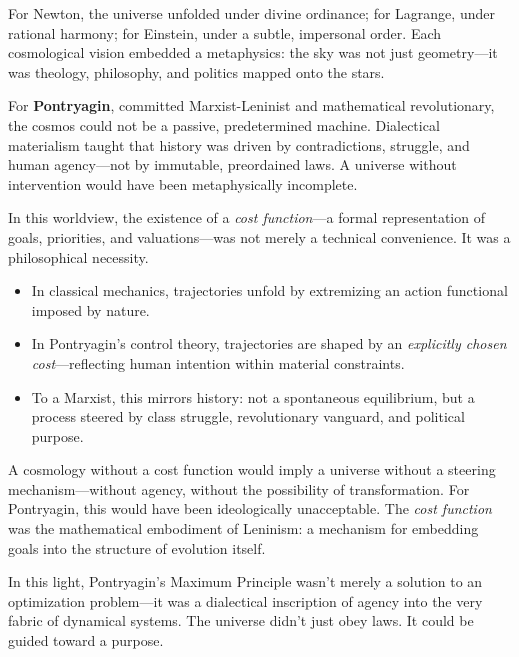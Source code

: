 \begin{tcolorbox}[colback=gray!10, colframe=black, title={Sidebar: Why a Marxist Cosmology Needed a Cost Function}, fonttitle=\bfseries, breakable]

  For Newton, the universe unfolded under divine ordinance; for Lagrange, under rational harmony; for Einstein, under a subtle, impersonal order. Each cosmological vision embedded a metaphysics: the sky was not just geometry—it was theology, philosophy, and politics mapped onto the stars.

  \medskip
  
  For \textbf{Pontryagin}, committed Marxist-Leninist and mathematical revolutionary, the cosmos could not be a passive, predetermined machine. Dialectical materialism taught that history was driven by contradictions, struggle, and human agency—not by immutable, preordained laws. A universe without intervention would have been metaphysically incomplete.

  \medskip
  
  In this worldview, the existence of a \emph{cost function}—a formal representation of goals, priorities, and valuations—was not merely a technical convenience. It was a philosophical necessity.

  \medskip
  
  \begin{itemize}
    \item In classical mechanics, trajectories unfold by extremizing an action functional imposed by nature.
    \item In Pontryagin’s control theory, trajectories are shaped by an \emph{explicitly chosen cost}—reflecting human intention within material constraints.
    \item To a Marxist, this mirrors history: not a spontaneous equilibrium, but a process steered by class struggle, revolutionary vanguard, and political purpose.
  \end{itemize}

  \medskip
  
  A cosmology without a cost function would imply a universe without a steering mechanism—without agency, without the possibility of transformation. For Pontryagin, this would have been ideologically unacceptable. The \emph{cost function} was the mathematical embodiment of Leninism: a mechanism for embedding goals into the structure of evolution itself.

  \medskip
  
  In this light, Pontryagin’s Maximum Principle wasn’t merely a solution to an optimization problem—it was a dialectical inscription of agency into the very fabric of dynamical systems. The universe didn’t just obey laws. It could be guided toward a purpose.
  
\end{tcolorbox}
  
